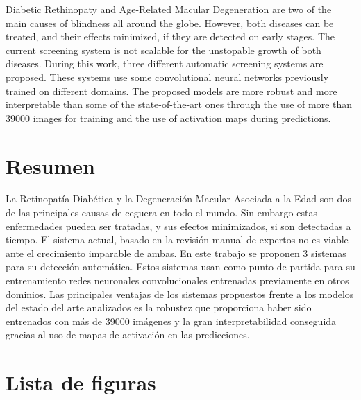 \documentclass[
  12pt,
  spanish,
  a4paperpaper,
]{report}
\begin{document}
Diabetic Rethinopaty and Age-Related Macular Degeneration are two of the
main causes of blindness all around the globe. However, both diseases
can be treated, and their effects minimized, if they are detected on
early stages. The current screening system is not scalable for the
unstopable growth of both diseases. During this work, three different
automatic screening systems are proposed. These systems use some
convolutional neural networks previously trained on different domains.
The proposed models are more robust and more interpretable than some of
the state-of-the-art ones through the use of more than 39000 images for
training and the use of activation maps during predictions.

\newpage

\hypertarget{resumen}{%
\chapter*{Resumen}\label{resumen}}

La Retinopatía Diabética y la Degeneración Macular Asociada a la Edad
son dos de las principales causas de ceguera en todo el mundo. Sin
embargo estas enfermedades pueden ser tratadas, y sus efectos
minimizados, si son detectadas a tiempo. El sistema actual, basado en la
revisión manual de expertos no es viable ante el crecimiento imparable
de ambas. En este trabajo se proponen 3 sistemas para su detección
automática. Estos sistemas usan como punto de partida para su
entrenamiento redes neuronales convolucionales entrenadas previamente en
otros dominios. Las principales ventajas de los sistemas propuestos
frente a los modelos del estado del arte analizados es la robustez que
proporciona haber sido entrenados con más de 39000 imágenes y la gran
interpretabilidad conseguida gracias al uso de mapas de activación en
las predicciones.

\setcounter{page}{1}

\newpage {}

\tableofcontents

\newpage

\hypertarget{lista-de-figuras}{%
\chapter*{Lista de figuras}\label{lista-de-figuras}}

\renewcommand{\listfigurename}{}
\listoffigures
\end{document}
